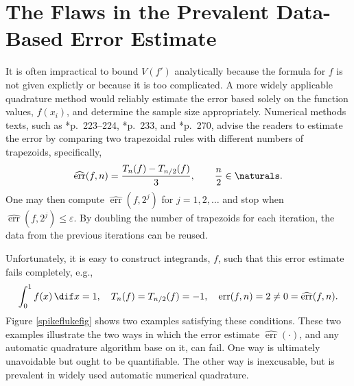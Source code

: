 \documentclass[]{amsart}
\DeclareMathOperator{\err}{err}
\newcommand{\herr}{\widehat{\err}}
\theoremstyle{definition}
\theoremstyle{remark}
\begin{document}
\section{The Flaws in the Prevalent Data-Based Error Estimate}
It is often impractical to bound $V(f')$ analytically because the formula for $f$ is not given explictly  or because it is too complicated.  A more widely applicable quadrature method would reliably estimate the error based solely on the function values, $f(x_i)$, and determine the sample size appropriately.  Numerical methods texts, such as *{p.\ 223--224}, *{p.\ 233}, and  *{p.\ 270}, advise the readers to estimate the error by comparing two trapezoidal rules with different numbers of trapezoids, specifically,
\begin{equation}\label{baderr}
\herr(f,n) = \frac{T_n(f) - T_{n/2}(f)}{3}, \qquad \frac n2 \in \naturals.
\end{equation}
One may then compute $\herr(f,2^j)$ for $j=1, 2, \ldots$ and stop when $\herr(f,2^j) \le \varepsilon$.  By doubling the number of trapezoids for each iteration, the data from the previous iterations can be reused.  

Unfortunately, it is easy to construct integrands, $f$, such that this error estimate fails completely, e.g.,
\begin{equation} \label{failcond}
\int_0^1 f(x) \, \dif x =  1, \quad T_{n}(f)=T_{n/2}(f) = -1, \quad \err(f,n)=2 \ne 0 = \herr(f,n).
\end{equation}
Figure \ref{spikeflukefig} shows two examples satisfying these conditions. These two examples illustrate the two ways in which the error estimate $\herr(\cdot)$, and any automatic quadrature algorithm base on it, can fail.  One way is ultimately unavoidable but ought to be quantifiable.  The other way is inexcusable, but is prevalent in widely used automatic numerical quadrature.
\end{document}
